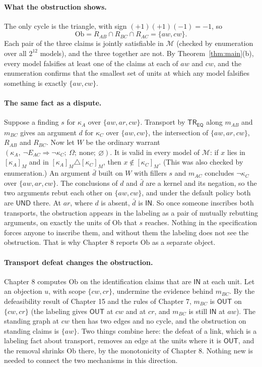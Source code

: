 \documentclass[11pt]{article}
\theoremstyle{plain}
\theoremstyle{definition}
\theoremstyle{remark}
\newcommand{\Om}{\Omega}
\newcommand{\Ob}{\mathrm{Ob}}
\newcommand{\IN}{\textsf{IN}}
\newcommand{\UND}{\textsf{UND}}
\newcommand{\OUT}{\textsf{OUT}}
\newcommand{\EQ}{\mathsf{EQ}}
\newcommand{\TR}{\mathsf{TR}}
\newcommand{\nk}[1]{\neg#1}
\newcommand{\ext}[2]{[#1]_{#2}}
\begin{document}
\paragraph{What the obstruction shows.} The only cycle is the triangle, with sign $(+1)(+1)(-1)=-1$, so
\[
\Ob=R_{AB}\cap R_{BC}\cap R_{AC}=\{aw,cw\}.
\]
Each pair of the three claims is jointly satisfiable in $\mathcal M$ (checked by enumeration over all $2^{12}$ models), and the three together are not. By Theorem~\ref{thm:main}(b), every model falsifies at least one of the claims at each of $aw$ and $cw$, and the enumeration confirms that the smallest set of units at which any model falsifies something is exactly $\{aw,cw\}$.

\paragraph{The same fact as a dispute.} Suppose a finding $s$ for $\kappa_A$ over $\{aw,ar,cw\}$. Transport by $\TR_{\EQ}$ along $m_{AB}$ and $m_{BC}$ gives an argument $d$ for $\kappa_C$ over $\{aw,cw\}$, the intersection of $\{aw,ar,cw\}$, $R_{AB}$ and $R_{BC}$. Now let $W$ be the ordinary warrant $(\kappa_A,\ \nk{E_{AC}}\Rightarrow\nk{\kappa_C};\ \Om;\ \mathrm{none};\ \varnothing)$. It is valid in every model of $\mathcal M$: if $x$ lies in $\ext{\kappa_A}{M}$ and in $\ext{\kappa_A}{M}\triangle\ext{\kappa_C}{M}$, then $x\notin\ext{\kappa_C}{M}$. (This was also checked by enumeration.) An argument $\bar d$ built on $W$ with fillers $s$ and $m_{AC}$ concludes $\nk{\kappa_C}$ over $\{aw,ar,cw\}$. The conclusions of $d$ and $\bar d$ are a kernel and its negation, so the two arguments rebut each other on $\{aw,cw\}$, and under the default policy both are $\UND$ there. At $ar$, where $d$ is absent, $\bar d$ is $\IN$. So once someone inscribes both transports, the obstruction appears in the labeling as a pair of mutually rebutting arguments, on exactly the units of $\Ob$ that $s$ reaches. Nothing in the specification forces anyone to inscribe them, and without them the labeling does not see the obstruction. That is why Chapter 8 reports $\Ob$ as a separate object.

\paragraph{Transport defeat changes the obstruction.} Chapter 8 computes $\Ob$ on the identification claims that are $\IN$ at each unit. Let an objection $u$, with scope $\{cw,cr\}$, undermine the evidence behind $m_{BC}$. By the defeasibility result of Chapter 15 and the rules of Chapter 7, $m_{BC}$ is $\OUT$ on $\{cw,cr\}$ (the labeling gives $\OUT$ at $cw$ and at $cr$, and $m_{BC}$ is still $\IN$ at $aw$). The standing graph at $cw$ then has two edges and no cycle, and the obstruction on standing claims is $\{aw\}$. Two things combine here: the defeat of a link, which is a labeling fact about transport, removes an edge at the units where it is $\OUT$, and the removal shrinks $\Ob$ there, by the monotonicity of Chapter 8. Nothing new is needed to connect the two mechanisms in this direction.
\end{document}
